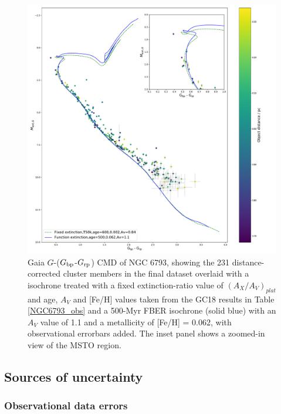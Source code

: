 \documentclass[12pt, a4paper]{report}
\begin{document}
\begin{figure}[h!]
\begin{center}
\includegraphics[width=1.0\textwidth]{../NGC_6793_CMD_FeH_0p062_Av_1p1_500Myr_vizier_isochrones_summary_errorbars.pdf}
\caption{Gaia $G$-($G_{\textnormal{bp}}$-$G_{\textnormal{rp}}$) CMD of NGC 6793, showing the 231 distance-corrected cluster members in the final dataset overlaid with a isochrone treated with a fixed extinction-ratio value of $(A_{X}/A_{V})_{plat}$ and age, $A_{V}$ and [Fe/H] values taken from the GC18 results in Table \ref{NGC6793_obs} and a 500-Myr FBER isochrone (solid blue) with an $A_{V}$ value of 1.1 and a metallicity of [Fe/H] = 0.062, with observational errorbars added. The inset panel shows a zoomed-in view of the MSTO region.}
\label{NGC_6793_isoc_inset_1.1_500_0.062}
\end{center}
\end{figure}

\subsection{Sources of uncertainty}
\subsubsection{Observational data errors}
\end{document}

